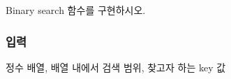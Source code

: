
\begin{DoxyRefList}
\item[\label{todo__todo000001}%
\hypertarget{todo__todo000001}{}%
File \hyperlink{hw07__03_8c}{hw07\-\_\-03.c} ]Binary search 함수를 구현하시오. \subsubsection*{입력}


\begin{DoxyItemize}
\item 정수 배열, 배열 내에서 검색 범위, 찾고자 하는 key 값\par

\end{DoxyItemize}
\end{DoxyRefList}